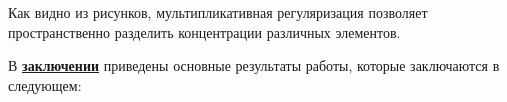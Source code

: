 Как видно из рисунков, мультипликативная регуляризация позволяет пространственно разделить концентрации различных элементов.

В \underline{\textbf{заключении}} приведены основные результаты работы, которые заключаются в следующем:

\newpage
{} %


